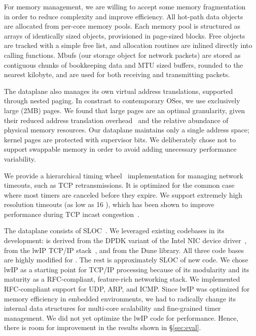 For memory management, we are willing to accept some memory fragmentation in order
to reduce complexity and improve efficiency. All hot-path data objects are allocated from
per-core memory pools. Each memory pool is structured as arrays
of identically sized objects, provisioned in page-sized blocks. Free objects
are tracked with a simple free list, and allocation routines are
inlined directly into calling functions. Mbufs (our storage object
for network packets) are stored as contiguous chunks of bookkeeping
data and MTU sized buffers, rounded to the nearest
kilobyte, and are used for both receiving and transmitting packets.

The dataplane also manages its own virtual address translations, supported
through nested paging. In constrast to contemporary OSes, we use exclusively
large (2MB) pages. We found that large pages are an optimal granularity,
given their reduced address translation overhead~\cite{DBLP:conf/isca/BasuGCHS13, dune}
and the relative abundance of physical memory resources. Our dataplane maintains
only a single address space; kernel pages are protected with
supervisor bits. We deliberately chose not to support swappable memory
in order to avoid adding unecessary performance variability.

We provide a hierarchical timing wheel~\cite{DBLP:conf/sosp/VargheseL87} implementation
for managing network timeouts, such as TCP retransmissions. It is optimized
for the common case where most timers are canceled before they expire. We support
extremely high resolution timeouts (as low as 16 \microsecond), which has been
shown to improve performance during TCP incast congestion~\cite{DBLP:conf/sigcomm/VasudevanPSKAGGM09}.

The dataplane  consists of  SLOC~\cite{url:sloccount}.  We
leveraged existing codebases in its development:  is derived from
the DPDK variant of the Intel NIC device driver~\cite{intel:dpdk},
 from the lwIP TCP/IP stack~\cite{dunkels2001design}, and 
from the Dune library.  All three code bases are highly modified for
\ix. The rest is approximately  SLOC of new code. We chose lwIP as a
starting point for TCP/IP processing because of its modularity and its
maturity as a RFC-compliant, feature-rich networking stack. We
implemented RFC-compliant support for UDP, ARP, and ICMP.
Since lwIP was optimized for memory efficiency in embedded
environments, we had to radically change its internal data structures
for multi-core scalability and fine-grained timer management. We did not
yet optimize the lwIP code for performance. Hence, there is room for
improvement in the results shown in \S\ref{sec:eval}.

